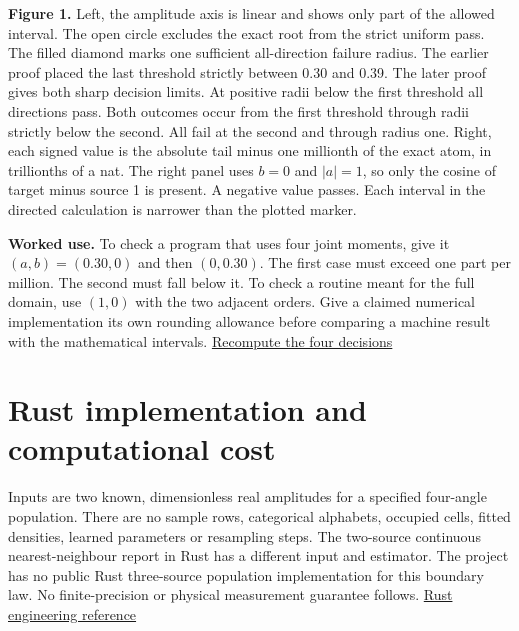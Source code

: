 \textbf{Figure 1.} Left, the amplitude axis is linear and shows only part of the allowed interval. The open circle excludes the exact root from the strict uniform pass. The filled diamond marks one sufficient all-direction failure radius. The earlier proof placed the last threshold strictly between 0.30 and 0.39. The later proof gives both sharp decision limits. At positive radii below the first threshold all directions pass. Both outcomes occur from the first threshold through radii strictly below the second. All fail at the second and through radius one. Right, each signed value is the absolute tail minus one millionth of the exact atom, in trillionths of a nat. The right panel uses \(b=0\) and \(|a|=1\), so only the cosine of target minus source 1 is present. A negative value passes. Each interval in the directed calculation is narrower than the plotted marker.

\textbf{Worked use.} To check a program that uses four joint moments, give it \((a,b)=(0.30,0)\) and then \((0,0.30)\). The first case must exceed one part per million. The second must fall below it. To check a routine meant for the full domain, use \((1,0)\) with the two adjacent orders. Give a claimed numerical implementation its own rounding allowance before comparing a machine result with the mathematical intervals. \href{https://github.com/sepahead/pid-rs/blob/main/audit/research/angular-unit-boundary/replay.py}{Recompute the four decisions}

\clearpage

\section{Rust implementation and computational cost}\label{rust-implementation-and-computational-cost}

Inputs are two known, dimensionless real amplitudes for a specified four-angle population. There are no sample rows, categorical alphabets, occupied cells, fitted densities, learned parameters or resampling steps. The two-source continuous nearest-neighbour report in Rust has a different input and estimator. The project has no public Rust three-source population implementation for this boundary law. No finite-precision or physical measurement guarantee follows. \href{https://github.com/sepahead/pid-rs/blob/ef705d1ed3410fd9fbbf4920cb4643f6a5140a2f/RUST_IMPLEMENTATION_AND_COST.md}{Rust engineering reference}

